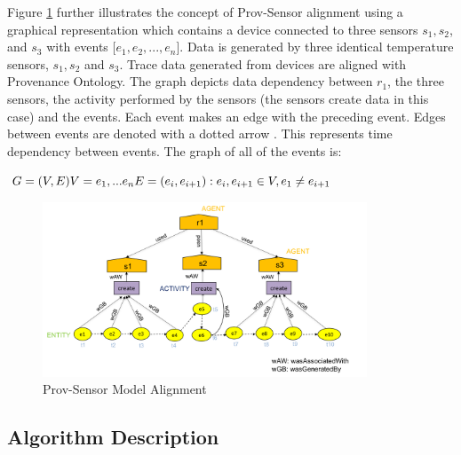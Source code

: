 \documentclass[conference]{IEEEtran}
\begin{document}
Figure \ref{prov_sensor} further illustrates the concept of Prov-Sensor alignment using a graphical representation which contains a device connected to three sensors $s_1, s_2$, and $s_3$ with events  [$e_1, e_2,...,e_n$]. Data is generated by three identical temperature sensors, $s_1, s_2$ and $s_3$. Trace data generated from devices are aligned with Provenance Ontology. The graph depicts data dependency between $r_1$, the three sensors, the activity performed by the sensors (the sensors create data in this case) and the events.  Each event makes an edge with the preceding event. Edges between events are denoted with a dotted arrow . This represents time dependency between events. The  graph of all of the events is:



\( \\ G = (V, E) \\ V =  { e_1, ...e_n } \\ E = { (e_i,e_{i+1}): e_i, e_{i+1} \in V, e_1 \neq e_{i+1}} \)

\begin{figure}[h!]
\begin{center}

\includegraphics[width=3.8in]{prov_sensor1.PNG}
\end{center}
\caption{Prov-Sensor Model Alignment }
\label{prov_sensor}
\end{figure}



\subsection{Algorithm Description}
\end{document}
